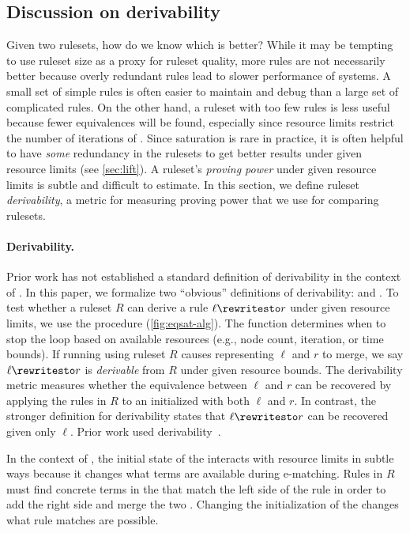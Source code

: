 \subsection{Discussion on derivability}
\label{subsec:derivability}

Given two rulesets, how do we know which is better?
While it may be tempting to use ruleset size as a proxy
  for ruleset quality, more rules are not necessarily better
  because overly redundant rules lead to slower performance of \eqsat
  systems.
A small set of simple rules is often easier to maintain and
  debug than a large set of complicated rules.
On the other hand, a ruleset with too few rules is less useful
  because fewer equivalences will be found,
  especially since resource limits restrict
  the number of iterations of \eqsat.
Since saturation is rare in practice, it is often helpful to have
  \textit{some} redundancy in the rulesets to get better results
  under given resource limits (see \autoref{sec:lift}).
 A ruleset's \textit{proving power} under given resource
  limits is subtle and difficult to estimate.
In this section, we define ruleset \textit{derivability}, a
  metric for measuring proving power that we use for comparing rulesets.

\paragraph*{Derivability.}
Prior work has not established a standard definition of derivability
  in the context of \eqsat.
In this paper, we formalize two ``obvious'' definitions of derivability:
  \lhsandrhs and \lhs.
To test whether a ruleset $R$ can derive a rule $\ell \rewritesto r$
  under given resource limits, we use the \eqsat procedure
  (\autoref{fig:eqsat-alg}).
The function 
  determines when to stop the \eqsat loop based on available resources
  (e.g., node count, iteration, or time bounds).
If running \eqsat using ruleset $R$ causes \eclasses representing
  $\ell$ and $r$ to merge, we say $\ell \rewritesto r$ is \textit{derivable}
  from $R$ under given resource bounds.
The \lhsandrhs derivability metric measures whether the equivalence between
  $\ell$ and $r$ can be recovered by applying the rules in $R$ to
  an \egraph initialized with both $\ell$ and $r$.
In contrast, the stronger \lhs definition for derivability states
  that $\ell \rewritesto r$ can be recovered given only $\ell$.
Prior work used \lhsandrhs derivability~\citep{ruler}.

In the context of \eqsat, the initial state of the \egraph interacts with
  resource limits in subtle ways because it changes what terms are
  available during e-matching.
Rules in $R$ must find concrete terms in the \egraph that match the
  left side of the rule in order to add the right side and merge the two
  \eclasses.
Changing the initialization of the \egraph changes what rule matches
  are possible.

